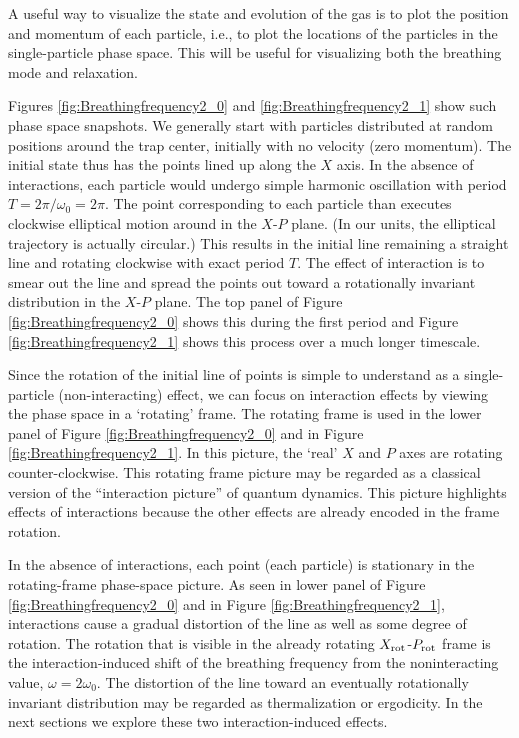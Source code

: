 \documentclass[aps,preprintnumbers,onecolumn,amsmath,amssymb,floatfix,pra]{revtex4-1}
\begin{document}
A useful way to visualize the state and evolution of the gas is to plot the position and momentum of
each particle, i.e., to plot the locations of the particles in the single-particle phase space.
This will be useful for visualizing both the breathing mode and relaxation. 

Figures \ref{fig:Breathingfrequency2_0} and \ref{fig:Breathingfrequency2_1} show such phase space
snapshots.  We generally start with particles distributed at random positions around the trap
center, initially with no velocity (zero momentum).  The initial state thus has the points lined up
along the $X$ axis.  In the absence of interactions, each particle would undergo simple harmonic
oscillation with period $T=2\pi/\omega_0 = 2\pi$.  The point corresponding to each particle than
executes clockwise elliptical motion around in the $X$-$P$ plane.  (In our units, the elliptical
trajectory is actually circular.)  This results in the initial line remaining a straight line and
rotating clockwise with exact period $T$.  The effect of interaction is to smear out the line and
spread the points out toward a rotationally invariant distribution in the  $X$-$P$ plane.  The top
panel of Figure  \ref{fig:Breathingfrequency2_0} shows this during the first period and Figure
\ref{fig:Breathingfrequency2_1} shows this process over a much longer timescale.

Since the rotation of the initial line of points is simple to understand as a single-particle
(non-interacting) effect, we can focus on interaction effects by viewing the phase space in a
`rotating' frame.  The rotating frame is used in the lower panel of Figure
\ref{fig:Breathingfrequency2_0} and in Figure \ref{fig:Breathingfrequency2_1}.  In this picture, the
`real' $X$ and $P$ axes are rotating counter-clockwise.  This rotating frame picture may be regarded
as a classical version of the ``interaction picture'' of quantum dynamics.  This picture highlights
effects of interactions because the other effects are already encoded in the frame rotation.

In the absence of interactions, each point (each particle) is stationary in the rotating-frame
phase-space picture.  As seen in lower panel of Figure \ref{fig:Breathingfrequency2_0} and in Figure
\ref{fig:Breathingfrequency2_1}, interactions cause a gradual distortion of the line as well as some
degree of rotation.
%
The rotation that is visible in the already rotating $X_{\rm rot}$-$P_{\rm rot}$ frame is the
interaction-induced shift of the breathing frequency from the noninteracting value,
$\omega=2\omega_0$.  The distortion of the line toward an eventually rotationally invariant
distribution may be regarded as thermalization or ergodicity.  In the next sections we explore these
two interaction-induced effects.
\end{document}
